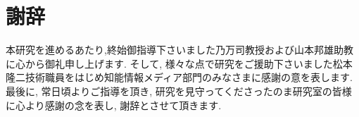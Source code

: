 \chapter*{謝辞}\label{chap:thank}
本研究を進めるあたり,終始御指導下さいました乃万司教授および山本邦雄助教に心から御礼申し上げます. そして, 様々な点で研究をご援助下さいました松本隆二技術職員をはじめ知能情報メディア部門のみなさまに感謝の意を表します. 最後に, 常日頃よりご指導を頂き, 研究を見守ってくださったのま研究室の皆様に心より感謝の念を表し, 謝辞とさせて頂きます.

